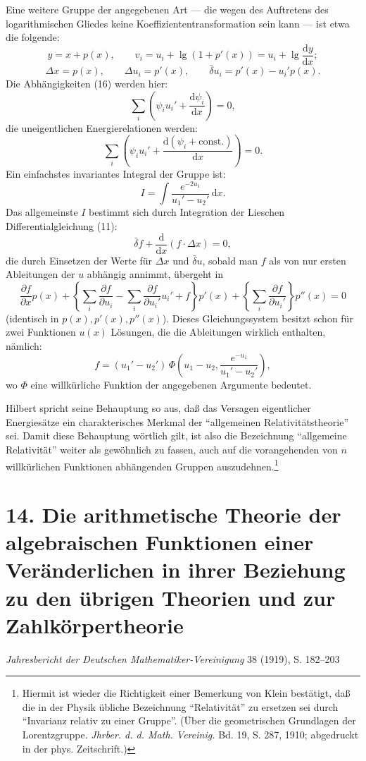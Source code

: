 \documentclass[11pt]{article}
\newcommand{\D}{\Delta}
\providecommand{\dd}{\mathrm d}
\providecommand{\bd}{\bar{\delta}}
\providecommand{\p}{\partial}
\providecommand{\p}{\partial}
\providecommand{\dd}{\mathrm d}
\begin{document}
Eine weitere Gruppe der angegebenen Art --- die wegen des Auftretens des logarithmischen Gliedes keine Koeffiziententransformation sein kann --- ist etwa die folgende:
\[
y=x+p(x),\qquad
v_i=u_i+\lg(1+p'(x))=u_i+\lg\frac{\dd y}{\dd x};
\]
\[
\D x=p(x),\qquad
\D u_i=p'(x),\qquad
\bd u_i=p'(x)-u_i'p(x).
\]
Die Abhängigkeiten (16) werden hier:
\[
\sum_i\left(\psi_i u_i'+\frac{\dd\psi_i}{\dd x}\right)=0,
\]
die uneigentlichen Energierelationen werden:
\[
\sum_i\left(\psi_i u_i'+
\frac{\dd(\psi_i+\mathrm{const.})}{\dd x}\right)=0.
\]
Ein einfachstes invariantes Integral der Gruppe ist:
\[
I=\int \frac{e^{-2u_1}}{u_1'-u_2'}\,\dd x.
\]
Das allgemeinste \(I\) bestimmt sich durch Integration der Lieschen Differentialgleichung (11):
\[
\bd f+\frac{\dd}{\dd x}(f\cdot \D x)=0,
\]
die durch Einsetzen der Werte für \(\D x\) und \(\bd u\), sobald man \(f\) als von nur ersten Ableitungen der \(u\) abhängig annimmt, übergeht in
\[
\frac{\p f}{\p x}p(x)
+\left\{\sum_i\frac{\p f}{\p u_i}
-\sum_i\frac{\p f}{\p u_i'}u_i'+f\right\}p'(x)
+\left\{\sum_i\frac{\p f}{\p u_i'}\right\}p''(x)=0
\]
(identisch in \(p(x),p'(x),p''(x)\)). Dieses Gleichungssystem besitzt schon für zwei Funktionen \(u(x)\) Lösungen, die die Ableitungen wirklich enthalten, nämlich:
\[
f=(u_1'-u_2')\,
\Phi\!\left(u_1-u_2,\frac{e^{-u_1}}{u_1'-u_2'}\right),
\]
wo \(\Phi\) eine willkürliche Funktion der angegebenen Argumente bedeutet.

Hilbert spricht seine Behauptung so aus, daß das Versagen eigentlicher Energiesätze ein charakterisches Merkmal der ``allgemeinen Relativitätstheorie'' sei. Damit diese Behauptung wörtlich gilt, ist also die Bezeichnung ``allgemeine Relativität'' weiter als gewöhnlich zu fassen, auch auf die vorangehenden von \(n\) willkürlichen Funktionen abhängenden Gruppen auszudehnen.\footnote{Hiermit ist wieder die Richtigkeit einer Bemerkung von Klein bestätigt, daß die in der Physik übliche Bezeichnung ``Relativität'' zu ersetzen sei durch ``Invarianz relativ zu einer Gruppe''. (Über die geometrischen Grundlagen der Lorentzgruppe. \emph{Jhrber. d. d. Math. Vereinig.} Bd. 19, S. 287, 1910; abgedruckt in der phys. Zeitschrift.)}


\section*{14. Die arithmetische Theorie der algebraischen Funktionen einer Veränderlichen in ihrer Beziehung zu den übrigen Theorien und zur Zahlkörpertheorie}
\begin{center}
\emph{Jahresbericht der Deutschen Mathematiker-Vereinigung} 38 (1919), S. 182--203
\end{center}
\end{document}
